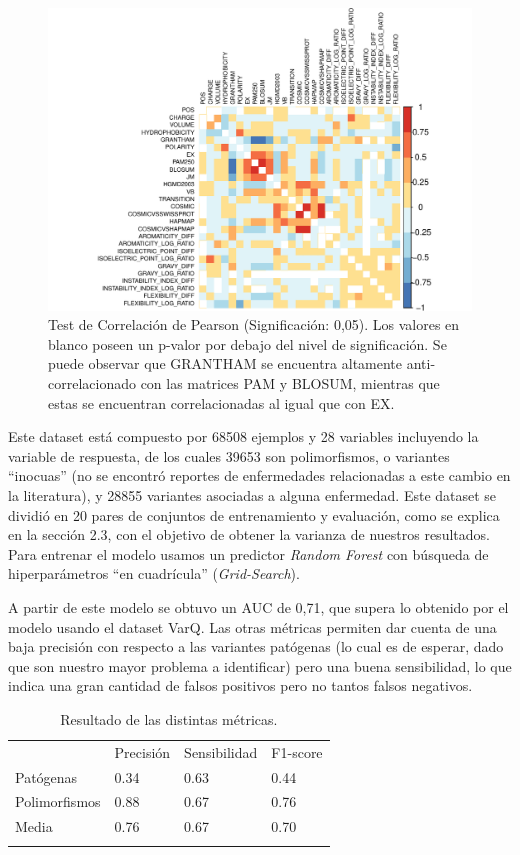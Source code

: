 \begin{figure}[H]
    \centering
    \includegraphics[scale=0.8]{documents/latex/figures/3/corrplot_1.pdf}
    \caption{Test de Correlación de Pearson (Significación: 0,05). Los valores en blanco poseen un p-valor por debajo del nivel de significación. Se puede observar que GRANTHAM se encuentra altamente anti-correlacionado con las matrices PAM y BLOSUM, mientras que estas se encuentran correlacionadas al igual que con EX.}
    \label{fig:corrplot_1}
\end{figure}

Este dataset está compuesto por 68508 ejemplos y 28 variables incluyendo la variable de respuesta, de los cuales 39653 son polimorfismos, o variantes ``inocuas'' (no se encontró reportes de enfermedades relacionadas a este cambio en la literatura), y 28855 variantes asociadas a alguna enfermedad. Este dataset se dividió en 20 pares de conjuntos de entrenamiento y evaluación, como se explica en la sección 2.3, con el objetivo de obtener la varianza de nuestros resultados. 
Para entrenar el modelo usamos un predictor \textit{Random Forest} con búsqueda de hiperparámetros ``en cuadrícula'' (\textit{Grid-Search}). 

A partir de este modelo se obtuvo un AUC de 0,71, que supera lo obtenido por el modelo usando el dataset VarQ. Las otras métricas permiten dar cuenta de una baja precisión con respecto a las variantes patógenas (lo cual es de esperar, dado que son nuestro mayor problema a identificar) pero una buena sensibilidad, lo que indica una gran cantidad de falsos positivos pero no tantos falsos negativos.

\begin{table}[H]
\centering
\begin{tabular}{llll}
              & Precisión & Sensibilidad & F1-score \\
Patógenas     & 0.34      & 0.63   & 0.44     \\
Polimorfismos & 0.88      & 0.67   & 0.76     \\
Media         & 0.76      & 0.67   & 0.70     \\
              &           &        &         
\end{tabular}
\caption{Resultado de las distintas métricas.}
\label{my-label}
\end{table}

